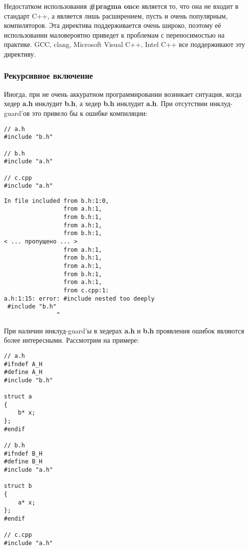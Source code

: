 Недостатком использования {\bf \#pragma once} является то, что она не входит в стандарт C++, а является лишь расширением, пусть и очень популярным, компиляторов. Эта директива поддерживается очень широко, поэтому её использовании маловероятно приведет к проблемам с переносимостью на практике. GCC, clang, Microsoft Visual C++, Intel C++ все поддерживают эту директиву.

\subsubsection{Рекурсивное включение}
\label{recursive_include}

Иногда, при не очень аккуратном программировании возникает ситуация, когда хедер {\bf a.h} инклудит {\bf b.h}, а хедер {\bf b.h} инклудит {\bf a.h}. При отсутствии инклуд-guard'ов это привело бы к ошибке компиляции:

\begin{verbatim}
// a.h
#include "b.h"

// b.h
#include "a.h"

// c.cpp
#include "a.h"
\end{verbatim}

\begin{verbatim}
In file included from b.h:1:0,
                 from a.h:1,
                 from b.h:1,
                 from a.h:1,
                 from b.h:1,
< ... пропущено ... >
                 from a.h:1,
                 from b.h:1,
                 from a.h:1,
                 from b.h:1,
                 from a.h:1,
                 from c.cpp:1:
a.h:1:15: error: #include nested too deeply
 #include "b.h"
               ^
\end{verbatim}

При наличии инклуд-guard'ы в хедерах {\bf a.h} и {\bf b.h} проявления ошибок являются более интересными. Рассмотрим на примере:
\begin{verbatim}
// a.h
#ifndef A_H
#define A_H
#include "b.h"

struct a
{
    b* x;
};
#endif

// b.h
#ifndef B_H
#define B_H
#include "a.h"

struct b
{
    a* x;
};
#endif

// c.cpp
#include "a.h"
\end{verbatim}

